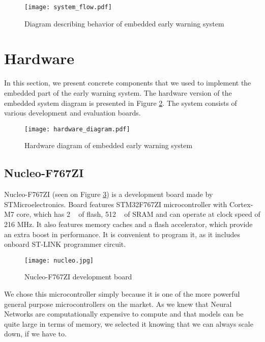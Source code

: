 \begin{figure}[ht]
        \centering
        \texttt{[image: system\_flow.pdf]} 
        \caption{ Diagram describing behavior of embedded early warning system} 
        \label{system_flow}
\end{figure}


\section{ Hardware}

In this section, we present concrete components that we used to implement the embedded part of the early warning system.
The hardware version of the embedded system diagram is presented in Figure \ref{hardware_diagram}.
The system consists of various development and evaluation boards.

\begin{figure}[ht]
        \centering
        \texttt{[image: hardware\_diagram.pdf]} 
        \caption{ Hardware diagram of embedded early warning system} 
        \label{hardware_diagram}
\end{figure}


\subsection{ Nucleo-F767ZI}

Nucleo-F767ZI (seen on Figure \ref{nucleo}) is a development board made by STMicroelectronics.
Board features STM32F767ZI microcontroller with Cortex-M7 core, which has 2 \si{\mega\byte} of flash, 512 \si{\kilo\byte} of SRAM and can operate at clock speed of 216 \si{\mega\hertz}.
It also features memory caches and a flash accelerator, which provide an extra boost in performance.
It is convenient to program it, as it includes onboard ST-LINK programmer circuit.

\begin{figure}[ht]
        \centering
        \texttt{[image: nucleo.jpg]} 
        \caption{ Nucleo-F767ZI development board} 
        \label{nucleo}
\end{figure}

We chose this microcontroller simply because it is one of the more powerful general purpose microcontrollers on the market.
As we knew that Neural Networks are computationally expensive to compute and that models can be quite large in terms of memory, we selected it knowing that we can always scale down, if we have to.


